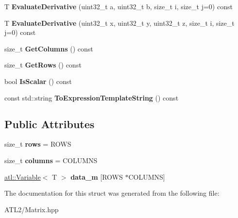 \begin{DoxyCompactItemize}
\item 
\hypertarget{structatl_1_1_fast_variable_matrix_ade8e35b01619a9f56871d8cf1a9adfec}{T {\bfseries Evaluate\+Derivative} (uint32\+\_\+t a, uint32\+\_\+t b, size\+\_\+t i, size\+\_\+t j=0) const }\label{structatl_1_1_fast_variable_matrix_ade8e35b01619a9f56871d8cf1a9adfec}

\item 
\hypertarget{structatl_1_1_fast_variable_matrix_a9d5a887bfe8d8c73b6ad7c4d70c2a4c7}{T {\bfseries Evaluate\+Derivative} (uint32\+\_\+t x, uint32\+\_\+t y, uint32\+\_\+t z, size\+\_\+t i, size\+\_\+t j=0) const }\label{structatl_1_1_fast_variable_matrix_a9d5a887bfe8d8c73b6ad7c4d70c2a4c7}

\item 
\hypertarget{structatl_1_1_fast_variable_matrix_a3bcd59b609b8006a5c2713df4a5f01d1}{size\+\_\+t {\bfseries Get\+Columns} () const }\label{structatl_1_1_fast_variable_matrix_a3bcd59b609b8006a5c2713df4a5f01d1}

\item 
\hypertarget{structatl_1_1_fast_variable_matrix_a5f4d637293bd81840200afe3cbbb468d}{size\+\_\+t {\bfseries Get\+Rows} () const }\label{structatl_1_1_fast_variable_matrix_a5f4d637293bd81840200afe3cbbb468d}

\item 
\hypertarget{structatl_1_1_fast_variable_matrix_a2d095dbef161ab6e752fe26d36368d30}{bool {\bfseries Is\+Scalar} () const }\label{structatl_1_1_fast_variable_matrix_a2d095dbef161ab6e752fe26d36368d30}

\item 
\hypertarget{structatl_1_1_fast_variable_matrix_a541d290c8e65a193dfb33cd980378df9}{const std\+::string {\bfseries To\+Expression\+Template\+String} () const }\label{structatl_1_1_fast_variable_matrix_a541d290c8e65a193dfb33cd980378df9}

\end{DoxyCompactItemize}
\subsection*{Public Attributes}
\begin{DoxyCompactItemize}
\item 
\hypertarget{structatl_1_1_fast_variable_matrix_a6eda2199e053d42508cfd95b30550d13}{size\+\_\+t {\bfseries rows} = R\+O\+W\+S}\label{structatl_1_1_fast_variable_matrix_a6eda2199e053d42508cfd95b30550d13}

\item 
\hypertarget{structatl_1_1_fast_variable_matrix_af2073a0de77f4b34465ecc697893225a}{size\+\_\+t {\bfseries columns} = C\+O\+L\+U\+M\+N\+S}\label{structatl_1_1_fast_variable_matrix_af2073a0de77f4b34465ecc697893225a}

\item 
\hypertarget{structatl_1_1_fast_variable_matrix_acaf869666ab9d0e81443c68a458b9489}{\hyperlink{structatl_1_1_variable}{atl\+::\+Variable}$<$ T $>$ {\bfseries data\+\_\+m} \mbox{[}R\+O\+W\+S $\ast$C\+O\+L\+U\+M\+N\+S\mbox{]}}\label{structatl_1_1_fast_variable_matrix_acaf869666ab9d0e81443c68a458b9489}

\end{DoxyCompactItemize}


The documentation for this struct was generated from the following file\+:\begin{DoxyCompactItemize}
\item 
A\+T\+L2/Matrix.\+hpp\end{DoxyCompactItemize}
